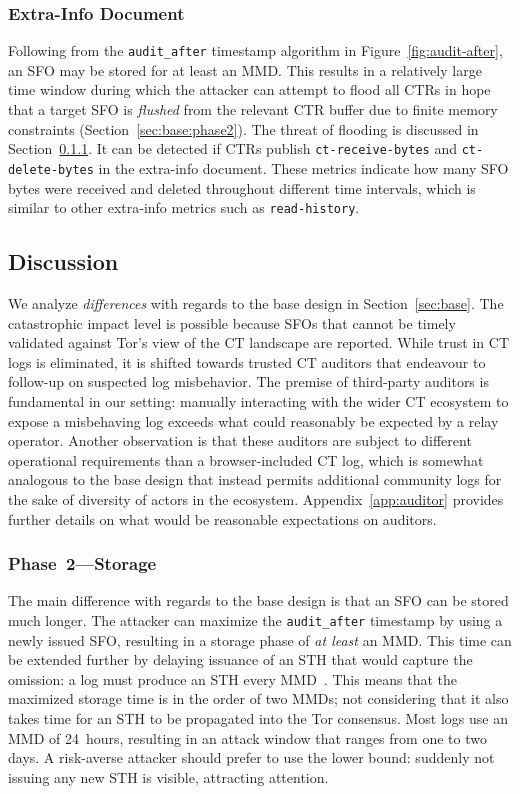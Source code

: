 \subsubsection{Extra-Info Document} \label{sec:auditor:extra-info}
Following from the \texttt{audit\_after} timestamp algorithm in
Figure~\ref{fig:audit-after}, an SFO may be stored for at least an MMD.  This
results in a relatively large time window during which the attacker can attempt
to flood all CTRs in hope that a target SFO is \emph{flushed} from the relevant
CTR buffer due to finite memory constraints (Section~\ref{sec:base:phase2}).
The threat of flooding is discussed in
Section~\ref{sec:auditor:analysis:phase2}.  It can be detected if CTRs publish
	\texttt{ct-receive-bytes} and
	\texttt{ct-delete-bytes}
in the extra-info document.  These metrics indicate how many SFO bytes were
received and deleted throughout different time intervals, which is similar to
other extra-info metrics such as \texttt{read-history}.

\subsection{Discussion} \label{sec:auditor:analysis}
We analyze \emph{differences} with regards to the base design in
Section~\ref{sec:base}.  The catastrophic impact level is possible because SFOs
that cannot be timely validated against Tor's view of the CT landscape are
reported.  While trust in CT logs is eliminated, it is shifted towards trusted
CT auditors that endeavour to follow-up on suspected log misbehavior. The
premise of third-party auditors is fundamental in our setting: manually
interacting with the wider CT ecosystem to expose a misbehaving log exceeds what
could reasonably be expected by a relay operator. Another observation is that
these auditors are subject to different operational requirements than a
browser-included CT log, which is somewhat analogous to the base design that
instead permits additional community logs for the sake of diversity of actors in
the ecosystem. Appendix~\ref{app:auditor} provides further details on what would
be reasonable expectations on auditors.

\subsubsection{Phase~2---Storage} \label{sec:auditor:analysis:phase2}
The main difference with regards to the base design is that an SFO can be
stored much longer.  The attacker can maximize the \texttt{audit\_after}
timestamp by using a newly issued SFO, resulting in a storage phase of \emph{at
least} an MMD.  This time can be extended further by delaying issuance of an
STH that would capture the omission:
	a log must produce an STH every MMD~\cite{ct,ct/bis}.
This means that the maximized storage time is in the order of two MMDs; not
considering that it also takes time for an STH to be propagated into the Tor
consensus.  Most logs use an MMD of 24~hours, resulting in an attack window that
ranges from one to two days.  A risk-averse attacker should prefer to use the
lower bound:
	suddenly not issuing any new STH is visible, attracting attention.

